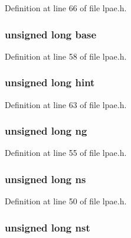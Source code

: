 \-Definition at line 66 of file lpae.\-h.

\hypertarget{structlpae__pt__t_a74f95eab64fb23344e30879684489f6f}{
\subsubsection[{base}]{\setlength{\rightskip}{0pt plus 5cm}unsigned long {\bf base}}}\label{structlpae__pt__t_a74f95eab64fb23344e30879684489f6f}


\-Definition at line 58 of file lpae.\-h.

\hypertarget{structlpae__pt__t_a6b9526601b3748535699c90ec4d83a70}{
\subsubsection[{hint}]{\setlength{\rightskip}{0pt plus 5cm}unsigned long {\bf hint}}}\label{structlpae__pt__t_a6b9526601b3748535699c90ec4d83a70}


\-Definition at line 63 of file lpae.\-h.

\hypertarget{structlpae__pt__t_a7e9b55fee8cbf4a7f95905d93b8eb8f6}{
\subsubsection[{ng}]{\setlength{\rightskip}{0pt plus 5cm}unsigned long {\bf ng}}}\label{structlpae__pt__t_a7e9b55fee8cbf4a7f95905d93b8eb8f6}


\-Definition at line 55 of file lpae.\-h.

\hypertarget{structlpae__pt__t_a0c9a7685114f88cfb4cc879031ccd9c2}{
\subsubsection[{ns}]{\setlength{\rightskip}{0pt plus 5cm}unsigned long {\bf ns}}}\label{structlpae__pt__t_a0c9a7685114f88cfb4cc879031ccd9c2}


\-Definition at line 50 of file lpae.\-h.

\hypertarget{structlpae__pt__t_adb22eee76377f57c572e33df1a66a27a}{
\subsubsection[{nst}]{\setlength{\rightskip}{0pt plus 5cm}unsigned long {\bf nst}}}\label{structlpae__pt__t_adb22eee76377f57c572e33df1a66a27a}


